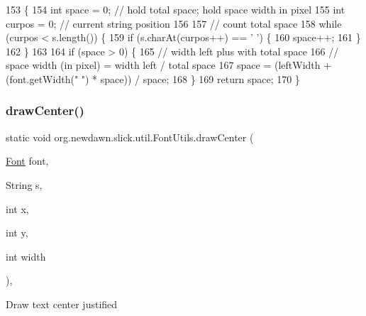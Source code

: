 \begin{DoxyCode}
153                                                  \{
154         \textcolor{keywordtype}{int} space = 0; \textcolor{comment}{// hold total space; hold space width in pixel}
155         \textcolor{keywordtype}{int} curpos = 0; \textcolor{comment}{// current string position}
156 
157         \textcolor{comment}{// count total space}
158         \textcolor{keywordflow}{while} (curpos < s.length()) \{
159             \textcolor{keywordflow}{if} (s.charAt(curpos++) == \textcolor{charliteral}{' '}) \{
160                 space++;
161             \}
162         \}
163 
164         \textcolor{keywordflow}{if} (space > 0) \{
165             \textcolor{comment}{// width left plus with total space}
166             \textcolor{comment}{// space width (in pixel) = width left / total space}
167             space = (leftWidth + (font.getWidth(\textcolor{stringliteral}{" "}) * space)) / space;
168         \}
169         \textcolor{keywordflow}{return} space;
170     \}
\end{DoxyCode}
\mbox{\label{classorg_1_1newdawn_1_1slick_1_1util_1_1_font_utils_aa150b527895846f84f99c01abcac007d}} 
\subsubsection{\texorpdfstring{draw\+Center()}{drawCenter()}\hspace{0.1cm}{\footnotesize\ttfamily [1/2]}}
{\footnotesize\ttfamily static void org.\+newdawn.\+slick.\+util.\+Font\+Utils.\+draw\+Center (\begin{DoxyParamCaption}\item[{\mbox{\hyperlink{interfaceorg_1_1newdawn_1_1slick_1_1_font}{Font}}}]{font,  }\item[{String}]{s,  }\item[{int}]{x,  }\item[{int}]{y,  }\item[{int}]{width }\end{DoxyParamCaption})\hspace{0.3cm}{\ttfamily [inline]}, {\ttfamily [static]}}

Draw text center justified


